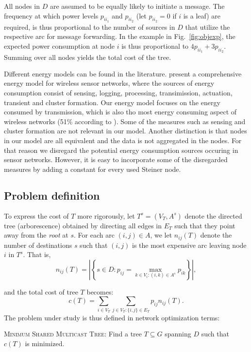 All nodes in $D$ are assumed to be equally likely to initiate a message.
The frequency at which power levels $p_{ii_1}$ and $p_{ii_2}$ (let $p_{ii_2}=0$ if $i$ is a leaf) are required,
is thus proportional to the number of sources in $D$ that utilize the respective arc for message forwarding.
In the example in Fig.\ \ref{fig:objexp}, the expected power consumption at node $i$ is thus proportional to $4p_{ii_1} + 3p_{ii_2}$.
Summing over all nodes yields the total cost of the tree.

Different energy models can be found in the literature. 
\cite{halgamuge} present a comprehensive energy model for wireless sensor networks, 
where the sources of energy consumption consist of sensing, logging, processing, transimission, actuation, transient and cluster formation.
Our energy model focuses on the energy consumed by transmission, which is also tho most energy consuming aspect of wireless networks (51\% according to \cite{halgamuge}).
Some of the measures such as sensing and cluster formation are not relevant in our model.
Another distinction is that nodes in our model are all equivalent and the data is not aggregated in the nodes.
For that reason we disregard the potential energy consumption sources occuring in sensor networks.
However, it is easy to incorporate some of the disregarded measures by adding a constant for every used Steiner node.

\subsection{Problem definition} \label{sec:probdef}

To express the cost of $T$ more rigorously, let $T^s=(V_T,A^s)$ denote the directed tree (arborescence) obtained by directing all edges in $E_T$ such that they point away from the \emph{root} at $s$.
For each arc $(i,j)\in A$, we let $n_{ij}(T)$ denote the number of destinations $s$ such that $(i,j)$ is the most expensive arc leaving node $i$ in $T^s$.
That is,
\[
  n_{ij}(T) = \left|\left\{s\in D: p_{ij}=\max_{k\in V_i: (i,k)\in A^s}p_{ik}\right\}\right|,
\]

\noindent
and the total cost of tree $T$ becomes:
$$
  c(T) = \sum_{i\in V_T}\sum_{j\in V_T:\{i,j\}\in E_T}p_{ij}n_{ij}(T).
$$ 
The problem under study is thus defined in network optimization terms:

\begin{problem}
\label{def:problem}
\textsc{Minimum Shared Multicast Tree}: Find a tree $T\subseteq G$ spanning $D$ such that $c(T)$ is minimized.
\end{problem}

